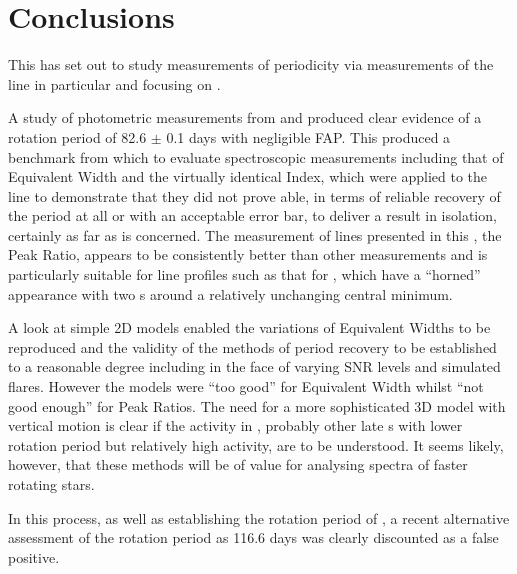 \chapter{Conclusions}
\protect\label{chapter:conclusions}

This {\paperorthesis} has set out to study measurements of periodicity via measurements of the {\ha} line in particular
and focusing on \prox.

A study of photometric measurements from {\asas} and {\hst} produced clear evidence of a rotation period of 82.6 $\pm$
0.1 days with negligible FAP. This produced a benchmark from which to evaluate spectroscopic measurements including that
of Equivalent Width and the virtually identical {\ha} Index, which were applied to the {\ha} line to demonstrate that
they did not prove able, in terms of reliable recovery of the period at all or with an acceptable error bar, to deliver
a result in isolation, certainly as far as {\prox} is concerned. The measurement of lines presented in this
\paperorthesis, the Peak Ratio, appears to be consistently better than other measurements and is particularly suitable
for {\ha} line profiles such as that for \prox, which have a ``horned'' appearance with two \horn s around a relatively
unchanging central minimum.

A look at simple 2D models enabled the variations of Equivalent Widths to be reproduced and the validity of the methods
of period recovery to be established to a reasonable degree including in the face of varying SNR levels and simulated
flares. However the models were ``too good'' for Equivalent Width whilst ``not good enough'' for Peak Ratios. The need
for a more sophisticated 3D model with vertical motion is clear if the activity in \prox, probably other late \rdwarf s
with lower rotation period but relatively high activity, are to be understood. It seems likely, however, that these
methods will be of value for analysing spectra of faster rotating stars.

In this process, as well as establishing the rotation period of \prox, a recent alternative assessment of the rotation
period as 116.6 days was clearly discounted as a false positive.
